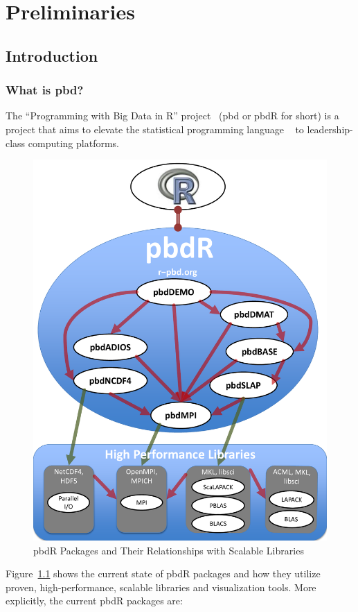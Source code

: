 \part{Preliminaries}




\chapter[Introduction]{Introduction}
\label{sec:introduction}


\section{What is pbd?}

The ``Programming with Big Data in R'' project~\citep{pbdR2012} (pbd or pbdR for short) is a project that aims to elevate the statistical programming language ~\citep{Rcore} to leadership-class computing platforms.  
\begin{figure}[t]
 \centering
 \includegraphics[scale=.45]{pbdDEMO-include/pics/pbdR}
 \caption{pbdR Packages and Their Relationships with Scalable Libraries}
 \label{fig:pbdrpackages}
\end{figure}
Figure~\ref{fig:pbdrpackages} shows the current state of pbdR packages and how they utilize proven, high-performance, scalable libraries and visualization tools.  More explicitly, the current pbdR packages are:

